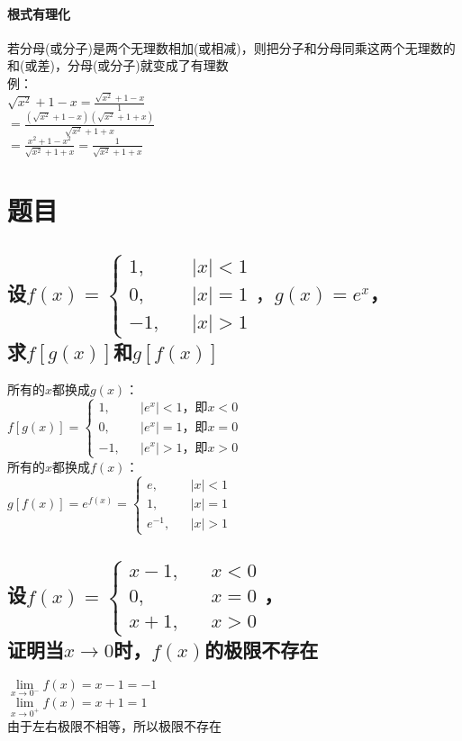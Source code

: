 \documentclass{article}
\begin{document}
\begin{flushleft}
\paragraph{根式有理化}
若分母(或分子)是两个无理数相加(或相减)，则把分子和分母同乘这两个无理数的和(或差)，分母(或分子)就变成了有理数\\
例：\\
\qquad $\sqrt{x^2}+1-x=\frac{\sqrt{x^2}+1-x}{1}$\\
\qquad $=\frac{(\sqrt{x^2}+1-x)(\sqrt{x^2}+1+x)}{\sqrt{x^2}+1+x}$\\
\qquad $=\frac{x^2+1-x^2}{\sqrt{x^2}+1+x}=\frac{1}{\sqrt{x^2}+1+x}$\\


\section{题目}

\subsection{
设$f(x)=\left\{
\begin{array}{rcl}
1,& & |x|<1\\
0,& & |x|=1\\
-1,& & |x|>1
\end{array} \right.，g(x)=e^x$，\\
求$f[g(x)]$和$g[f(x)]$
}
所有的$x$都换成$g(x)$：\\
$f[g(x)]=\left\{
\begin{array}{rcl}
1,& & |e^x|<1，\mbox{即}x<0\\
0,& & |e^x|=1，\mbox{即}x=0\\
-1,& & |e^x|>1，\mbox{即}x>0
\end{array} \right.$\\
所有的$x$都换成$f(x)$：\\
$g[f(x)]=e^{f(x)}=\left\{
\begin{array}{rcl}
e,& & |x|<1\\
1,& & |x|=1\\
e^{-1},& & |x|>1
\end{array} \right.$\\

\subsection{
设$f(x)=\left\{
\begin{array}{rcl}
x-1,& & x<0\\
0,& & x=0\\
x+1,& & x>0
\end{array} \right.$，\\
证明当$x\to 0$时，$f(x)$的极限不存在
}
$\lim\limits_{x\to 0^-}f(x)=x-1=-1$\\
$\lim\limits_{x\to 0^+}f(x)=x+1=1$\\
由于左右极限不相等，所以极限不存在\\


\end{flushleft}
\end{document}
